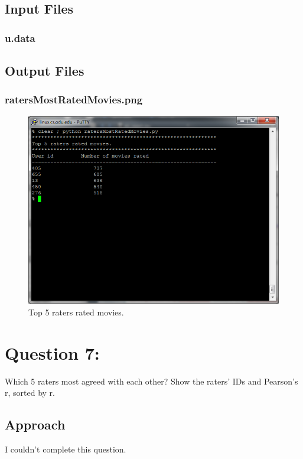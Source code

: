 \documentclass[12pt]{article}
\begin{document}
\subsection{Input Files}
\subsubsection{u.data}


\subsection{Output Files}
\subsubsection{ratersMostRatedMovies.png}
\begin{figure}[ht]
\includegraphics[scale=1.0]{../Q6/ratersMostRatedMovies}
\centering
\caption{Top 5 raters rated movies.}
\label{fig:ratersMostRatedMovies}
\end{figure}
\newpage
\section{Question 7:}
Which 5 raters most agreed with each other? Show the raters'
IDs and Pearson's r, sorted by r.
\subsection{Approach}
I couldn't complete this question.
\end{document}
